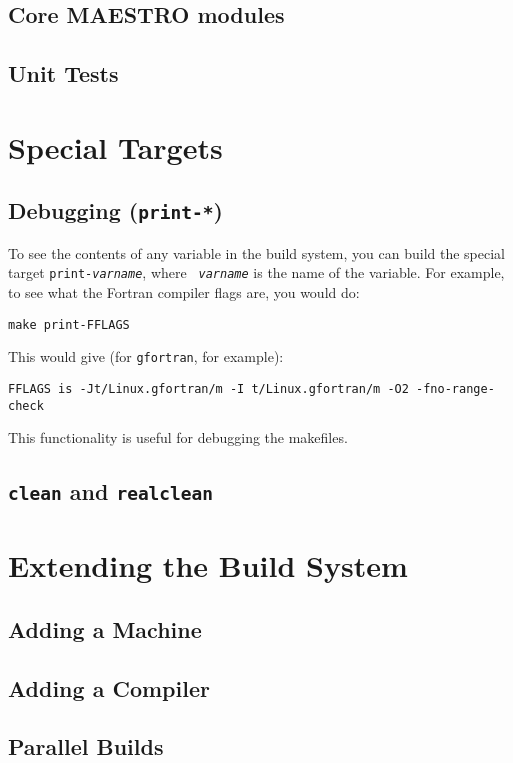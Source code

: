 \subsection{Core MAESTRO modules}

\subsection{Unit Tests}


\section{Special Targets}

\subsection{Debugging ({\tt print-*})}

To see the contents of any variable in the build system, you can build
the special target {\tt print-{\em varname}}, where {\tt {\em
varname}} is the name of the variable.  For example, to see what the
Fortran compiler flags are, you would do:
\begin{verbatim}
make print-FFLAGS
\end{verbatim}
This would give (for {\tt gfortran}, for example):
\begin{verbatim}
FFLAGS is -Jt/Linux.gfortran/m -I t/Linux.gfortran/m -O2 -fno-range-check
\end{verbatim}
This functionality is useful for debugging the makefiles.

\subsection{{\tt clean} and {\tt realclean}}



\section{Extending the Build System}

\subsection{Adding a Machine}

\subsection{Adding a Compiler}

\subsection{Parallel Builds}





